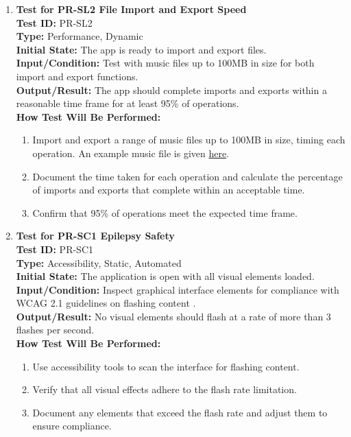 \documentclass[12pt, titlepage]{article}
\begin{document}
\begin{enumerate}
    \item \textbf{Test for PR-SL2 File Import and Export Speed} \\
      \newline
      \textbf{Test ID:} PR-SL2 \\
      \textbf{Type:} Performance, Dynamic \\
      \textbf{Initial State:} The app is ready to import and export files. \\
      \textbf{Input/Condition:} Test with music files up to 100MB in size for both import and export functions. \\
      \textbf{Output/Result:} The app should complete imports and exports within a reasonable time frame for at least 95\% of operations. \\
      \textbf{How Test Will Be Performed:}
      \begin{enumerate}
          \item Import and export a range of music files up to 100MB in size, timing each operation. An example music file is given 
          \href{https://github.com/emilyperica/ScoreGen/blob/main/test/TestingDatasets/piano-samples/sample-songs/hot-cross-buns-piano-solo.wav}{here}.
          \item Document the time taken for each operation and calculate the percentage of imports and exports that complete within an acceptable time.
          \item Confirm that 95\% of operations meet the expected time frame.
      \end{enumerate}

    \item \textbf{Test for PR-SC1 Epilepsy Safety} \\
      \newline
      \textbf{Test ID:} PR-SC1 \\
      \textbf{Type:} Accessibility, Static, Automated \\
      \textbf{Initial State:} The application is open with all visual elements loaded. \\
      \textbf{Input/Condition:} Inspect graphical interface elements for compliance with WCAG 2.1 guidelines on flashing content 
      \citep*{WCAG21}. \\
      \textbf{Output/Result:} No visual elements should flash at a rate of more than 3 flashes per second. \\
      \textbf{How Test Will Be Performed:}
      \begin{enumerate}
          \item Use accessibility tools to scan the interface for flashing content.
          \item Verify that all visual effects adhere to the flash rate limitation.
          \item Document any elements that exceed the flash rate and adjust them to ensure compliance.
      \end{enumerate}


\end{enumerate}
\end{document}
